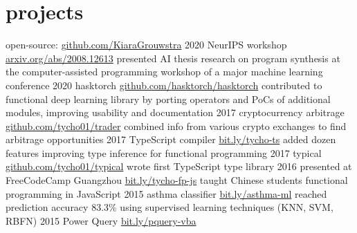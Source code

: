 \documentclass[]{friggeri-cv}
\begin{document}
\newpage

\section{projects}

\begin{entrylist}
\entry
    {}
    {open-source: }
    {\href{https://www.github.com/KiaraGrouwstra}{github.com/KiaraGrouwstra}}
    {}
   \entry
     {2020}
     {NeurIPS workshop}
     {\href{https://arxiv.org/abs/2008.12613}{arxiv.org/abs/2008.12613}}
     {
         presented AI thesis research on program synthesis at the computer-assisted programming workshop of a major machine learning conference
     }
  \entry
    {2020}
    {hasktorch}
    {\href{https://github.com/hasktorch/hasktorch}{github.com/hasktorch/hasktorch}}
    {
      contributed to functional deep learning library by porting operators and PoCs of additional modules, improving usability and documentation
    }
  \entry
    {2017}
    {cryptocurrency arbitrage}
    {\href{https://github.com/KiaraGrouwstra/trader}{github.com/tycho01/trader}}
    {
      combined info from various crypto exchanges to find arbitrage opportunities
    }
  \entry
    {2017}
    {TypeScript compiler}
    {\href{https://github.com/Microsoft/TypeScript/pulls/KiaraGrouwstra}{bit.ly/tycho-ts}}
    {
      added dozen features improving type inference for functional programming
    }
  \entry
    {2017}
    {typical}
    {\href{https://github.com/KiaraGrouwstra/typical}{github.com/tycho01/typical}}
    {
      wrote first TypeScript type library
    }
  \entry
    {2016}
    {%
presented at
      FreeCodeCamp Guangzhou
    }
    {\href{https://www.slideshare.net/TychoGrouwstra/fp-in-js}{bit.ly/tycho-fp-js}}
    {taught Chinese students functional programming in JavaScript}
  \entry
    {2015}
    {%
asthma
      classifier
      \normalfont{}
    }
    {\href{http://bit.ly/asthma-ml}{bit.ly/asthma-ml}}
    {
      reached prediction accuracy 83.3\% using supervised learning techniques (KNN, SVM, RBFN)
    }
  \entry
    {2015}
    {%
Power Query 
    }
    {\href{https://blog.crossjoin.co.uk/2015/06/10/power-queryexcel-2016-vba-examples/}{bit.ly/pquery-vba}}

\end{entrylist}
\end{document}
